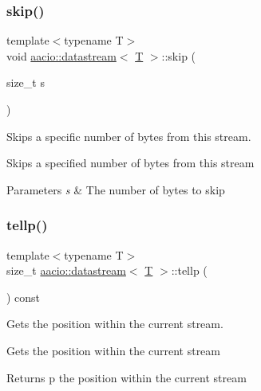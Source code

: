 \subsubsection{\texorpdfstring{skip()}{skip()}}
{\footnotesize\ttfamily template$<$typename T$>$ \\
void \mbox{\hyperlink{classaacio_1_1datastream}{aacio\+::datastream}}$<$ \mbox{\hyperlink{struct_t}{T}} $>$\+::skip (\begin{DoxyParamCaption}\item[{size\+\_\+t}]{s }\end{DoxyParamCaption})\hspace{0.3cm}{\ttfamily [inline]}}



Skips a specific number of bytes from this stream. 

Skips a specified number of bytes from this stream 
\begin{DoxyParams}{Parameters}
{\em s} & The number of bytes to skip \\
\hline
\end{DoxyParams}
\mbox{\label{classaacio_1_1datastream_a8cfb6fd8d13e7fa5e146007b77b16ac3}} 
\subsubsection{\texorpdfstring{tellp()}{tellp()}}
{\footnotesize\ttfamily template$<$typename T$>$ \\
size\+\_\+t \mbox{\hyperlink{classaacio_1_1datastream}{aacio\+::datastream}}$<$ \mbox{\hyperlink{struct_t}{T}} $>$\+::tellp (\begin{DoxyParamCaption}{ }\end{DoxyParamCaption}) const\hspace{0.3cm}{\ttfamily [inline]}}



Gets the position within the current stream. 

Gets the position within the current stream \begin{DoxyReturn}{Returns}
p the position within the current stream 
\end{DoxyReturn}
\mbox{\label{classaacio_1_1datastream_a18871fe58368deca0fd61d0fd7616755}} 
